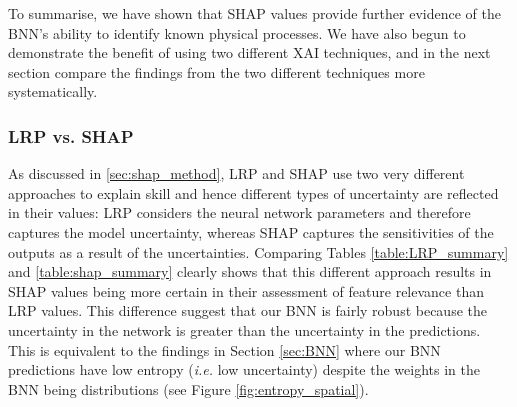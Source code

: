 \documentclass[a4paper]{article}
\begin{document}
To summarise, we have shown that SHAP values provide further evidence of the BNN's ability to identify known physical processes. We have also begun to demonstrate the benefit of using two different XAI techniques, and in the next section compare the findings from the two different techniques more systematically.
\subsubsection{LRP vs. SHAP}\label{sec:shap_vs_LRP}
 As discussed in \ref{sec:shap_method}, LRP and SHAP use two very different approaches to explain skill and hence different types of uncertainty are reflected in their values: LRP considers the neural network parameters and therefore captures the model uncertainty, whereas SHAP captures the sensitivities of the outputs as a result of the uncertainties. Comparing Tables \ref{table:LRP_summary} and \ref{table:shap_summary} clearly shows that this different approach results in SHAP values being more certain in their assessment of feature relevance than LRP values. This difference suggest that our BNN is fairly robust because the uncertainty in the network is greater than the uncertainty in the predictions. This is equivalent to the findings in Section \ref{sec:BNN} where our BNN predictions have low entropy (\textit{i.e.} low uncertainty) despite the weights in the BNN being distributions (see Figure  \ref{fig:entropy_spatial}).
\end{document}
